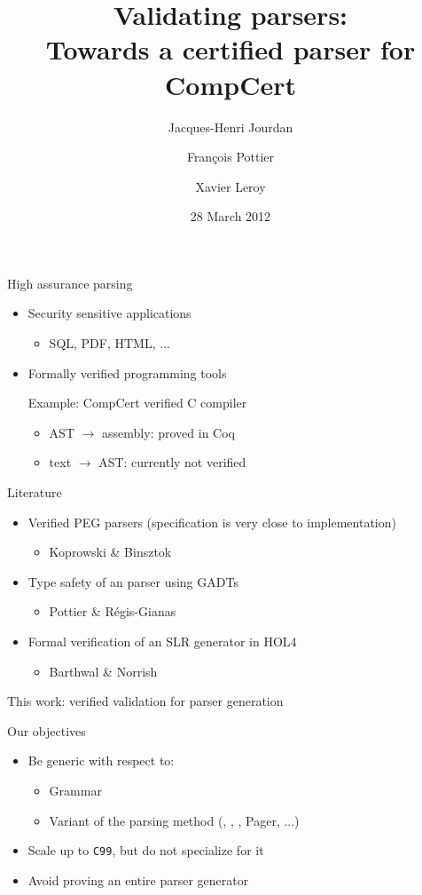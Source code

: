 \documentclass{beamer}
\title{Validating \lrone parsers:\\
  {\small Towards a certified parser for CompCert}}
\author{Jacques-Henri Jourdan\inst{1,2}
        \and François Pottier\inst{2}
        \and Xavier Leroy\inst{2}}
\institute{École Normale Supérieure \and INRIA Paris-Rocquencourt}
\date{28 March 2012}
\begin{document}
\frame{\titlepage}

\begin{frame}{High assurance parsing}
\begin{itemize}
\item Security sensitive applications
  \begin{itemize}
  \item SQL, PDF, HTML, ...
  \end{itemize}
\item Formally verified programming tools

  Example: CompCert verified C compiler
  \begin{itemize}
  \item AST $\rightarrow$ assembly: proved in Coq
  \item text $\rightarrow$ AST: currently not verified
  \end{itemize}
\end{itemize}
\end{frame}

\begin{frame}{Literature}
  \begin{itemize}
  \item Verified PEG parsers (specification is very close to
    implementation)
    \begin{itemize}
    \item Koprowski \& Binsztok
    \end{itemize}
  \item Type safety of an \lrone parser using GADTs
    \begin{itemize}
    \item Pottier \& Régis-Gianas
    \end{itemize}
  \item Formal verification of an SLR generator in HOL4
    \begin{itemize}
    \item Barthwal \& Norrish
    \end{itemize}
  \end{itemize}
  This work: verified validation for \lrone parser generation
\end{frame}


\begin{frame}{Our objectives}
\begin{itemize}
\item Be generic with respect to:
  \begin{itemize}
  \item Grammar
  \item Variant of the \lrone parsing method (\lrzero, \slr, \lalr, Pager, \lrone...)
  \end{itemize}
\item Scale up to \texttt{C99}, but do not specialize for it
\item Avoid proving an entire parser generator
\end{itemize}
\end{frame}
\end{document}
